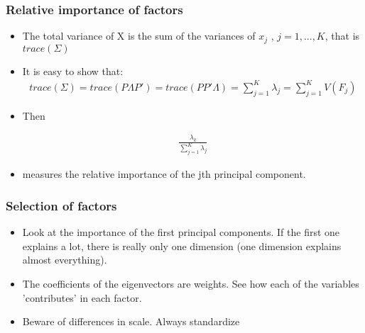 \documentclass[
  shownotes,
  xcolor={svgnames},
  hyperref={colorlinks,citecolor=DarkBlue,linkcolor=DarkRed,urlcolor=DarkBlue}
  , aspectratio=169]{beamer}
\begin{document}
\begin{frame}
\frametitle{Relative importance of factors}
\begin{itemize}


\item The total variance of X is the sum of the variances of $x_j$ , $j = 1, ..., K$, that is $trace(\Sigma)$
\item It is easy to show that:
\begin{align}
trace(\Sigma) = trace(P \Lambda P')= trace(PP' \Lambda ) = \sum_{j=1}^K \lambda_j= \sum_{j=1}^K V(F_j)
\end{align}
\item Then

\begin{align}
\frac{\lambda_k}{\sum_{j=1}^K \lambda_j}
\end{align}

\item measures the relative importance of the jth principal component.
\end{itemize}
\end{frame}

\begin{frame}
\frametitle{Selection of factors}

\begin{itemize}


\item Look at the importance of the first principal components. If the first one explains a lot, there is really only one dimension (one dimension explains almost everything).
\bigskip
\item The coefficients of the eigenvectors are weights. See how each of the variables 'contributes' in each factor.
\bigskip
\item Beware of differences in scale. Always standardize 
\end{itemize}
\end{frame}
\end{document}
